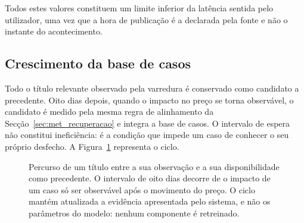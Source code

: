 Todos estes valores constituem um limite inferior da latência sentida pelo utilizador, uma vez que
a hora de publicação é a declarada pela fonte e não o instante do acontecimento.

\subsection{Crescimento da base de casos}
\label{sec:sis_base}

Todo o título relevante observado pela varredura é conservado como candidato a precedente. Oito
dias depois, quando o impacto no preço se torna observável, o candidato é medido pela mesma regra
de alinhamento da Secção~\ref{sec:met_recuperacao} e integra a base de casos. O intervalo de
espera não constitui ineficiência: é a condição que impede um caso de conhecer o seu próprio
desfecho. A Figura~\ref{fig:sis_ciclo_kb} representa o ciclo.

\begin{figure}[ht]
\centering
{}
\caption[Ciclo de crescimento da base de casos]{Percurso de um título entre a sua observação e a
sua disponibilidade como precedente. O intervalo de oito dias decorre de o impacto de um caso só
ser observável após o movimento do preço. O ciclo mantém atualizada a evidência apresentada pelo
sistema, e não os parâmetros do modelo: nenhum componente é retreinado.}
\label{fig:sis_ciclo_kb}
\end{figure}

